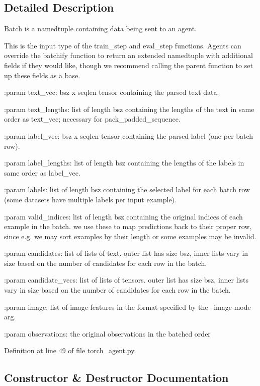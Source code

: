 \subsection{Detailed Description}
\begin{DoxyVerb}Batch is a namedtuple containing data being sent to an agent.

This is the input type of the train_step and eval_step functions.
Agents can override the batchify function to return an extended namedtuple
with additional fields if they would like, though we recommend calling the
parent function to set up these fields as a base.

:param text_vec:
    bsz x seqlen tensor containing the parsed text data.

:param text_lengths:
    list of length bsz containing the lengths of the text in same order as
    text_vec; necessary for pack_padded_sequence.

:param label_vec:
    bsz x seqlen tensor containing the parsed label (one per batch row).

:param label_lengths:
    list of length bsz containing the lengths of the labels in same order as
    label_vec.

:param labels:
    list of length bsz containing the selected label for each batch row (some
    datasets have multiple labels per input example).

:param valid_indices:
    list of length bsz containing the original indices of each example in the
    batch. we use these to map predictions back to their proper row, since e.g.
    we may sort examples by their length or some examples may be invalid.

:param candidates:
    list of lists of text. outer list has size bsz, inner lists vary in size
    based on the number of candidates for each row in the batch.

:param candidate_vecs:
    list of lists of tensors. outer list has size bsz, inner lists vary in size
    based on the number of candidates for each row in the batch.

:param image:
    list of image features in the format specified by the --image-mode arg.

:param observations:
    the original observations in the batched order
\end{DoxyVerb}
 

Definition at line 49 of file torch\+\_\+agent.\+py.



\subsection{Constructor \& Destructor Documentation}
\mbox{\label{classparlai_1_1core_1_1torch__agent_1_1Batch_a6ef9b406e741e455da515aa8f84c798e}} 
